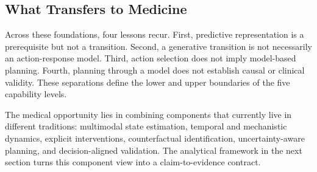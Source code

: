 \subsection{What Transfers to Medicine}

Across these foundations, four lessons recur. First, predictive representation is a prerequisite but not a transition. Second, a generative transition is not necessarily an action-response model. Third, action selection does not imply model-based planning. Fourth, planning through a model does not establish causal or clinical validity. These separations define the lower and upper boundaries of the five capability levels.

The medical opportunity lies in combining components that currently live in different traditions: multimodal state estimation, temporal and mechanistic dynamics, explicit interventions, counterfactual identification, uncertainty-aware planning, and decision-aligned validation. The analytical framework in the next section turns this component view into a claim-to-evidence contract.
